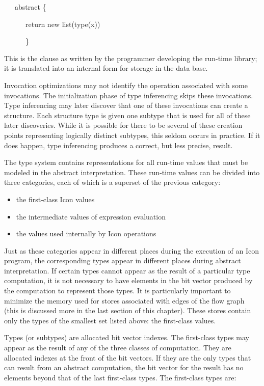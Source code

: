 {\ttfamily\mdseries
\ \ \ abstract \{}

{\ttfamily\mdseries
\ \ \ \ \ \ return new list(type(x))}

{\ttfamily\mdseries
\ \ \ \ \ \ \}}

This is the clause as written by the programmer developing the
run-time library; it is translated into an internal form for storage
in the data base.

Invocation optimizations may not identify the operation associated
with some invocations. The initialization phase of type inferencing
skips these invocations. Type inferencing may later discover that one
of these invocations can create a structure. Each structure type is
given one subtype that is used for all of these later
discoveries. While it is possible for there to be several of these
creation points representing logically distinct subtypes, this seldom
occurs in practice. If it does happen, type inferencing produces a
correct, but less precise, result.

The type system contains representations for all run-time values that
must be modeled in the abstract interpretation.  These run-time values
can be divided into three categories, each of which is a superset of
the previous category:

\liststyleLxxii
\begin{itemize}
\item 
the first-class Icon values 
\item 
the intermediate values of expression evaluation 
\item 
the values used internally by Icon operations 
\end{itemize}

Just as these categories appear in different places during the
execution of an Icon program, the corresponding types appear in
different places during abstract interpretation. If certain types
cannot appear as the result of a particular type computation, it is
not necessary to have elements in the bit vector produced by the
computation to represent those types. It is particularly important to
minimize the memory used for stores associated with edges of the flow
graph (this is discussed more in the last section of this
chapter). These stores contain only the types of the smallest set
listed above: the first-class values.

Types (or subtypes) are allocated bit vector indexes. The first-class
types may appear as the result of any of the three classes of
computation. They are allocated indexes at the front of the bit
vectors. If they are the only types that can result from an abstract
computation, the bit vector for the result has no elements beyond that
of the last first-class types. The first-class types are:

